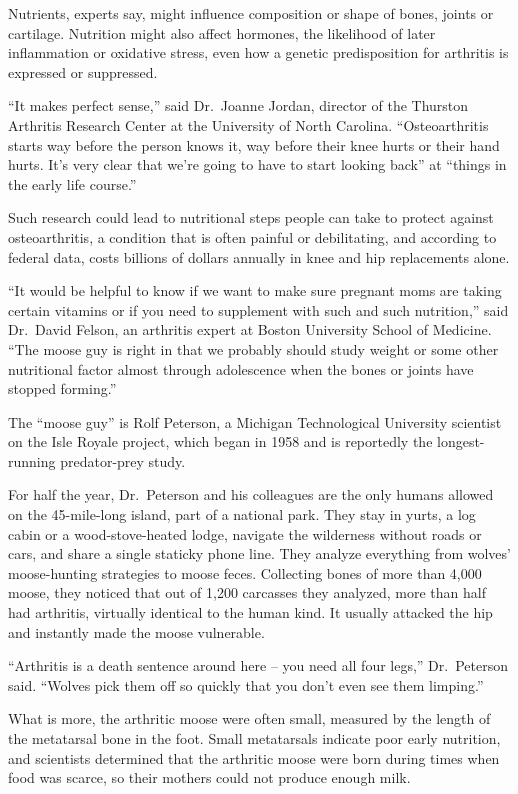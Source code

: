 ﻿\documentclass[12pt]{article}
\begin{document}
Nutrients, experts say, might influence composition or shape of bones, joints or cartilage.
Nutrition might also affect hormones, the likelihood of later inflammation or oxidative stress, even
how a genetic predisposition for arthritis is expressed or suppressed.

``It makes perfect sense,'' said Dr.~Joanne Jordan, director of the Thurston Arthritis Research
Center at the University of North Carolina. ``Osteoarthritis starts way before the person knows it,
way before their knee hurts or their hand hurts. It's very clear that we're going to have to start
looking back'' at ``things in the early life course.''

Such research could lead to nutritional steps people can take to protect against osteoarthritis, a
condition that is often painful or debilitating, and according to federal data, costs billions of
dollars annually in knee and hip replacements alone.

``It would be helpful to know if we want to make sure pregnant moms are taking certain vitamins or
if you need to supplement with such and such nutrition,'' said Dr.~David Felson, an arthritis expert
at Boston University School of Medicine. ``The moose guy is right in that we probably should study
weight or some other nutritional factor almost through adolescence when the bones or joints have
stopped forming.''

The ``moose guy'' is Rolf Peterson, a Michigan Technological University scientist on the Isle Royale
project, which began in 1958 and is reportedly the longest-running predator-prey study.

For half the year, Dr.~Peterson and his colleagues are the only humans allowed on the 45-mile-long
island, part of a national park. They stay in yurts, a log cabin or a wood-stove-heated lodge,
navigate the wilderness without roads or cars, and share a single staticky phone line. They analyze
everything from wolves' moose-hunting strategies to moose feces. Collecting bones of more than 4,000
moose, they noticed that out of 1,200 carcasses they analyzed, more than half had arthritis,
virtually identical to the human kind. It usually attacked the hip and instantly made the moose
vulnerable.

``Arthritis is a death sentence around here -- you need all four legs,'' Dr.~Peterson said. ``Wolves
pick them off so quickly that you don't even see them limping.''

What is more, the arthritic moose were often small, measured by the length of the metatarsal bone in
the foot. Small metatarsals indicate poor early nutrition, and scientists determined that the
arthritic moose were born during times when food was scarce, so their mothers could not produce
enough milk.
\end{document}

